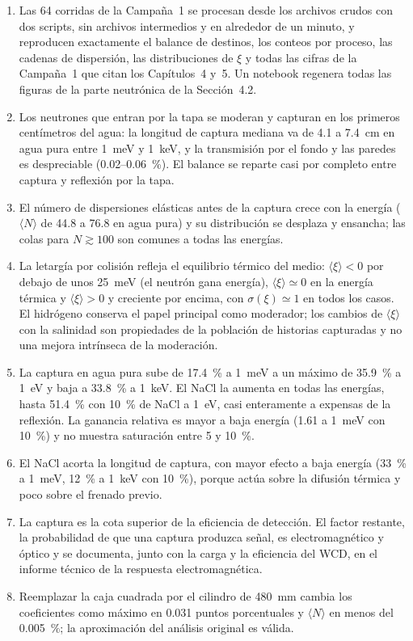 \documentclass[11pt,a4paper]{article}
\begin{document}
\begin{enumerate}
  \item Las 64 corridas de la Campaña~1 se procesan desde los archivos crudos con dos scripts, sin archivos intermedios y en alrededor de un minuto, y reproducen exactamente el balance de destinos, los conteos por proceso, las cadenas de dispersión, las distribuciones de $\xi$ y todas las cifras de la Campaña~1 que citan los Capítulos~4 y~5. Un notebook regenera todas las figuras de la parte neutrónica de la Sección~4.2.
  \item Los neutrones que entran por la tapa se moderan y capturan en los primeros centímetros del agua: la longitud de captura mediana va de 4.1 a 7.4~cm en agua pura entre 1~meV y 1~keV, y la transmisión por el fondo y las paredes es despreciable (0.02--0.06~\%). El balance se reparte casi por completo entre captura y reflexión por la tapa.
  \item El número de dispersiones elásticas antes de la captura crece con la energía ($\langle N\rangle$ de 44.8 a 76.8 en agua pura) y su distribución se desplaza y ensancha; las colas para $N\gtrsim100$ son comunes a todas las energías.
  \item La letargía por colisión refleja el equilibrio térmico del medio: $\langle\xi\rangle<0$ por debajo de unos 25~meV (el neutrón gana energía), $\langle\xi\rangle\simeq0$ en la energía térmica y $\langle\xi\rangle>0$ y creciente por encima, con $\sigma(\xi)\simeq1$ en todos los casos. El hidrógeno conserva el papel principal como moderador; los cambios de $\langle\xi\rangle$ con la salinidad son propiedades de la población de historias capturadas y no una mejora intrínseca de la moderación.
  \item La captura en agua pura sube de 17.4~\% a 1~meV a un máximo de 35.9~\% a 1~eV y baja a 33.8~\% a 1~keV. El NaCl la aumenta en todas las energías, hasta 51.4~\% con 10~\% de NaCl a 1~eV, casi enteramente a expensas de la reflexión. La ganancia relativa es mayor a baja energía (1.61 a 1~meV con 10~\%) y no muestra saturación entre 5 y 10~\%.
  \item El NaCl acorta la longitud de captura, con mayor efecto a baja energía (33~\% a 1~meV, 12~\% a 1~keV con 10~\%), porque actúa sobre la difusión térmica y poco sobre el frenado previo.
  \item La captura es la cota superior de la eficiencia de detección. El factor restante, la probabilidad de que una captura produzca señal, es electromagnético y óptico y se documenta, junto con la carga y la eficiencia del WCD, en el informe técnico de la respuesta electromagnética.
  \item Reemplazar la caja cuadrada por el cilindro de 480~mm cambia los coeficientes como máximo en 0.031 puntos porcentuales y $\langle N\rangle$ en menos del 0.005~\%; la aproximación del análisis original es válida.
\end{enumerate}
\end{document}
